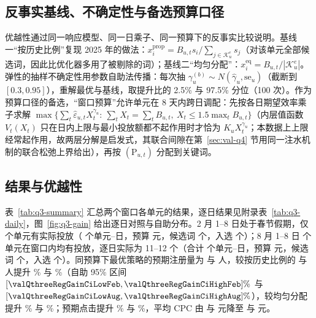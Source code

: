 \subsection{反事实基线、不确定性与备选预算口径}
\label{sec:q3base}
优越性通过同一响应模型、同一日乘子、同一预算下的反事实比较说明。基线一“按历史比例”复现 2025 年的做法：$x^{\mathrm{prop}}_i=B_{u,t}s_i/\sum_{j\in\mathcal K^{e}_u}s_j$（对该单元全部候选词，因此比优化器多用了被剔除的词）；基线二“均匀分配”：$x^{\mathrm{eq}}_i=B_{u,t}/|\mathcal K^{e}_u|$。弹性的抽样不确定性用参数自助法\cite{efron1993}传播：每次抽 $\gamma_u^{(b)}\sim N(\hat\gamma_u,\mathrm{se}_u)$（截断到 $[0.3,0.95]$），重解最优与基线，取提升比的 2.5\% 与 97.5\% 分位（100 次）。作为预算口径的备选，“窗口预算”允许单元在 8 天内跨日调配：先按各日期望效率乘子求解 $\max\{\sum_t\hat\varepsilon_{u,t}X_t^{\gamma_u}:\ \sum_tX_t=\sum_tB_{u,t},\ X_t\le1.5\max_tB_{u,t}\}$（内层值函数 $V_t(X_t)$ 只在日内上限与最小投放额都不起作用时才恰为 $K_uX_t^{\gamma_u}$；本数据上上限经常起作用，故两层分解是启发式，其联合间隙在第~\ref{sec:val-q4} 节用同一注水机制的联合松弛上界给出），再按 $(\mathrm P_{u,t})$ 分配到关键词。

\subsection{结果与优越性}
\label{sec:q3res}
表~\ref{tab:q3-summary} 汇总两个窗口各单元的结果，逐日结果见附录表~\ref{tab:q3-daily}，图~\ref{fig:q3-gain} 给出逐日对照与自助分布。2 月 1--8 日处于春节假期，仅 \valQthreeUnitsFeb{} 个单元有实际投放（\valQthreeUnitDaysFeb{} 个单元--日，预算 \valQthreeBudgetFeb{} 元，候选词 \valQthreeEligibleKeywordsFeb{} 个，入选 \valQthreeSelectedKeywordsFeb{} 个）；8 月 1--8 日 \valQthreeUnitsAug{} 个单元在窗口内均有投放，逐日实际为 11--12 个（合计 \valQthreeUnitDaysAug{} 个单元--日，预算 \valQthreeBudgetAug{} 元，候选词 \valQthreeEligibleKeywordsAug{} 个，入选 \valQthreeSelectedKeywordsAug{} 个）。同预算下最优策略的预期注册量为 \valQthreeOptRegsFeb{} 与 \valQthreeOptRegsAug{} 人，较按历史比例的 \valQthreePropRegsFeb{} 与 \valQthreePropRegsAug{} 人提升 \valQthreeRegGainPctFeb\% 与 \valQthreeRegGainPctAug\%（自助 95\% 区间 $[\valQthreeRegGainCiLowFeb,\valQthreeRegGainCiHighFeb]\%$ 与 $[\valQthreeRegGainCiLowAug,\valQthreeRegGainCiHighAug]\%$），较均匀分配提升 \valQthreeEqualRegGainPctFeb\% 与 \valQthreeEqualRegGainPctAug\%；预期点击提升 \valQthreeClickGainPctFeb\% 与 \valQthreeClickGainPctAug\%，平均 CPC 由 \valQthreePropCpcFeb{} 与 \valQthreePropCpcAug{} 元降至 \valQthreeAvgCpcFeb{} 与 \valQthreeAvgCpcAug{} 元。

